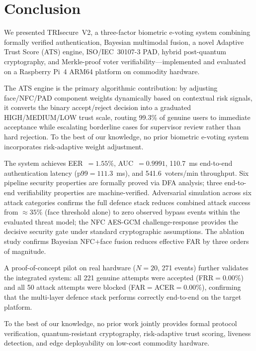 \documentclass[conference]{IEEEtran}
\begin{document}
\section{Conclusion}
\label{sec:conclusion}

We presented TRIsecure~V2, a three-factor biometric e-voting system
combining formally verified authentication, Bayesian multimodal fusion,
a novel Adaptive Trust Score (ATS) engine, ISO/IEC~30107-3 PAD, hybrid
post-quantum cryptography, and Merkle-proof voter verifiability—implemented
and evaluated on a Raspberry Pi~4 ARM64 platform on commodity hardware.

The ATS engine is the primary algorithmic contribution: by adjusting
face/NFC/PAD component weights dynamically based on contextual risk signals,
it converts the binary accept/reject decision into a graduated
HIGH/MEDIUM/LOW trust scale, routing 99.3\% of genuine users to immediate
acceptance while escalating borderline cases for supervisor review rather
than hard rejection. To the best of our knowledge, no prior biometric e-voting system
incorporates risk-adaptive weight adjustment.

The system achieves EER~\(=1.55\%\), AUC~\(=0.9991\), 110.7~ms
end-to-end authentication latency (p99\(=111.3\)~ms), and 541.6~voters/min
throughput. Six pipeline security properties are formally proved via DFA
analysis; three end-to-end verifiability properties are machine-verified.
Adversarial simulation across six attack categories confirms the full
defence stack reduces combined attack success from \(\approx35\%\) (face
threshold alone) to zero observed bypass events within the evaluated
threat model; the NFC AES-GCM challenge-response provides the
decisive security gate under standard cryptographic assumptions. The ablation study confirms Bayesian NFC\(+\)face
fusion reduces effective FAR by three orders of magnitude.

A proof-of-concept pilot on real hardware (\(N{=}20\), 271 events)
further validates the integrated system: all 221 genuine attempts
were accepted (FRR\(=0.00\%\)) and all 50 attack attempts were
blocked (FAR\(=\)ACER\(=0.00\%\)), confirming that the multi-layer
defence stack performs correctly end-to-end on the target platform.

To the best of our knowledge, no prior work jointly provides formal protocol
verification, quantum-resistant cryptography, risk-adaptive trust scoring,
liveness detection, and edge deployability on low-cost commodity hardware.
\end{document}
